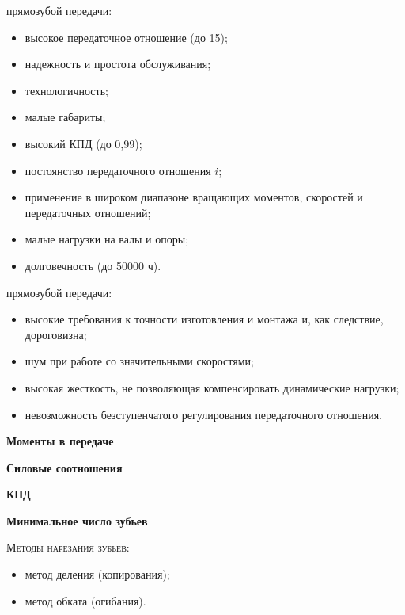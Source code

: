 \documentclass{tufte-book}
\begin{document}
 прямозубой передачи:
\begin{itemize}
	\item высокое передаточное отношение (до 15);
	\item надежность и простота обслуживания;
	\item технологичность;
	\item малые габариты;
	\item высокий КПД (до 0,99);
	\item постоянство передаточного отношения $ i $;
	\item применение в широком диапазоне вращающих моментов, скоростей и передаточных отношений;
	\item малые нагрузки на валы и опоры;
	\item долговечность (до 50000 ч).
\end{itemize}

 прямозубой передачи:
\begin{itemize}
	\item высокие требования к точ­ности изготовления и монтажа и, как следствие, дороговизна;
	\item шум при работе со значительными скоростями;
	\item высокая жесткость, не позволяющая компенсировать динамические нагрузки;
	\item невозможность безступенчатого регулирования передаточного отношения.
\end{itemize}

\begin{flushleft}
	\textbf{Моменты в передаче}
\end{flushleft}


\begin{flushleft}
	\textbf{Силовые соотношения}
\end{flushleft}

\begin{flushleft}
	\textbf{КПД}
\end{flushleft}


\begin{flushleft}
	\textbf{Минимальное число зубьев}
\end{flushleft}

\textsc{Методы нарезания зубьев}:
\begin{itemize}
	\item метод деления (копирования);
	\item метод обката (огибания).
\end{itemize}
\end{document}

